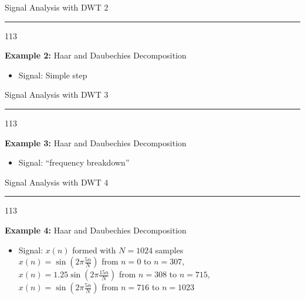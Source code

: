 \documentclass[a4,portrait,slidesonly]{seminar}
\begin{document}
\begin{slide*}
{\large \textsf{Signal Analysis with DWT \hfill{2}}}\\
\hrule
\vspace{10pt}
\begin{dinglist} {113}
\item \textbf{Example 2:} Haar and Daubechies Decomposition
    \begin{itemize} 
    \item Signal: Simple step
    \end{itemize}
\end{dinglist}
\end{slide*}

\begin{slide*}
{\large \textsf{Signal Analysis with DWT \hfill{3}}}\\
\hrule
\vspace{10pt}
\begin{dinglist} {113}
\item \textbf{Example 3:} Haar and Daubechies Decomposition
    \begin{itemize} 
    \item Signal: ``frequency breakdown'' 
    \end{itemize}
\end{dinglist}
\end{slide*}

\begin{slide*}
{\large \textsf{Signal Analysis with DWT \hfill{4}}}\\
\hrule
\vspace{10pt}
\begin{dinglist} {113}
\item \textbf{Example 4:} Haar and Daubechies Decomposition
    \begin{itemize} 
    \item Signal: $x(n)$ formed with $N=1024$ samples \\
    $x(n)=\sin(2\pi\frac{5n}{N})$ from $n=0$ to $n=307$, \\
    $x(n)=1.25\sin(2\pi\frac{15n}{N})$ from $n=308$ to $n=715$, \\
    $x(n)=\sin(2\pi\frac{5n}{N})$ from $n=716$ to $n=1023$ 
    \end{itemize}
\end{dinglist}
\end{slide*}
\end{document}
